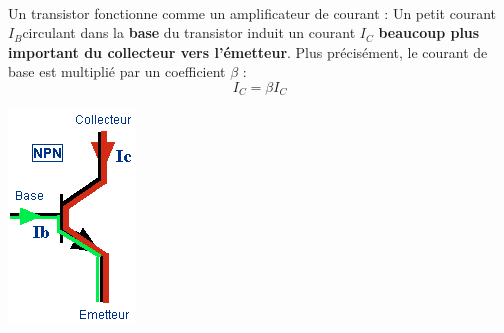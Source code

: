 \documentclass[10pt,fleqn]{article} %
\begin{document}
\begin{aretenir}~\\
  \begin{minipage}{.8\textwidth}
    Un transistor fonctionne comme un amplificateur de courant : Un petit courant $I_B$circulant dans la \textbf{base} du transistor induit un courant $I_C$ \textbf{beaucoup plus important du collecteur vers l'émetteur}. Plus précisément, le courant de base est multiplié par un coefficient $\beta$ :
    $$I_C = \beta I_C$$
  \end{minipage}
  \begin{minipage}{.15\textwidth}
    \includegraphics[width=\textwidth]{images/principe_transistor}
  \end{minipage}
\end{aretenir}
\end{document}

